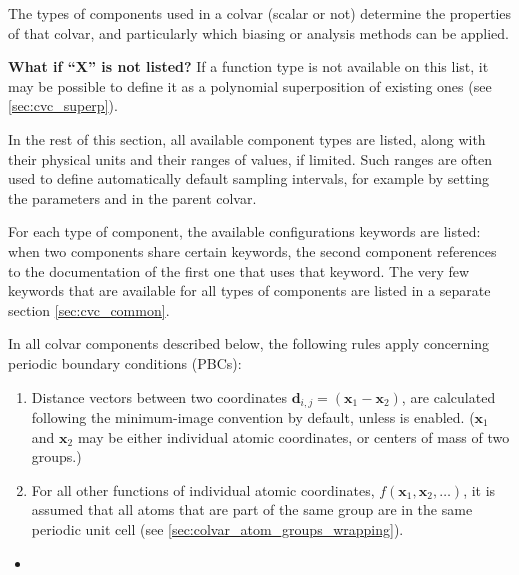 The types of components used in a colvar (scalar or not) determine the
properties of that colvar, and particularly which biasing or analysis methods
can be applied.

\textbf{What if ``X'' is not listed?} If a function type is not available on this list, it may be possible to define it as a polynomial superposition of existing ones (see \ref{sec:cvc_superp}).

In the rest of this section, all available component types are listed, along with their physical units and their ranges of values, if limited.
Such ranges are often used to define automatically default sampling intervals, for example by setting the parameters  and  in the parent colvar.

For each type of component, the available configurations keywords are listed:
when two components share certain keywords, the second component references to
the documentation of the first one that uses that keyword.
The very few keywords that are available for all types of components are listed in a separate section \ref{sec:cvc_common}.



In all colvar components described below, the following rules apply concerning periodic boundary
conditions (PBCs):
\begin{enumerate}
\item Distance vectors between two coordinates
  $\mathbf{d}_{i,j} = \left(\mathbf{x}_1 - \mathbf{x}_2\right)$, are calculated following the
  minimum-image convention by default, unless  is enabled.
  ($\mathbf{x}_1$ and $\mathbf{x}_2$ may be either individual atomic coordinates, or centers of mass
  of two groups.)
\item For all other functions of individual atomic coordinates,
  $f\left(\mathbf{x}_1, \mathbf{x}_2, \ldots\right)$, it is assumed that all atoms that are part of
  the same group are in the same periodic unit cell (see \ref{sec:colvar_atom_groups_wrapping}).
\end{enumerate}

\begin{itemize}
\item %
\end{itemize}

